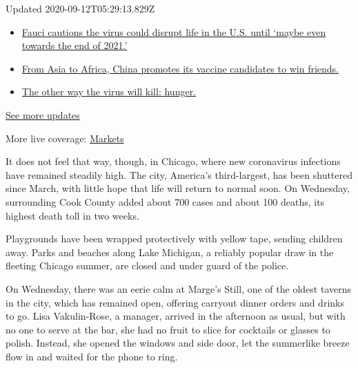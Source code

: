 Updated 2020-09-12T05:29:13.829Z

\begin{itemize}
\tightlist
\item
  \href{https://www.nytimes3xbfgragh.onion/2020/09/11/world/covid-19-coronavirus.html?action=click\&pgtype=Article\&state=default\&region=MAIN_CONTENT_1\&context=storylines_live_updates\#link-dfb8a16}{Fauci
  cautions the virus could disrupt life in the U.S. until `maybe even
  towards the end of 2021.'}
\item
  \href{https://www.nytimes3xbfgragh.onion/2020/09/11/world/covid-19-coronavirus.html?action=click\&pgtype=Article\&state=default\&region=MAIN_CONTENT_1\&context=storylines_live_updates\#link-7104d154}{From
  Asia to Africa, China promotes its vaccine candidates to win friends.}
\item
  \href{https://www.nytimes3xbfgragh.onion/2020/09/11/world/covid-19-coronavirus.html?action=click\&pgtype=Article\&state=default\&region=MAIN_CONTENT_1\&context=storylines_live_updates\#link-393ad215}{The
  other way the virus will kill: hunger.}
\end{itemize}

\href{https://www.nytimes3xbfgragh.onion/2020/09/11/world/covid-19-coronavirus.html?action=click\&pgtype=Article\&state=default\&region=MAIN_CONTENT_1\&context=storylines_live_updates}{See
more updates}

More live coverage:
\href{https://www.nytimes3xbfgragh.onion/live/2020/09/11/business/stock-market-today-coronavirus?action=click\&pgtype=Article\&state=default\&region=MAIN_CONTENT_1\&context=storylines_live_updates}{Markets}

It does not feel that way, though, in Chicago, where new coronavirus
infections have remained steadily high. The city, America's
third-largest, has been shuttered since March, with little hope that
life will return to normal soon. On Wednesday, surrounding Cook County
added about 700 cases and about 100 deaths, its highest death toll in
two weeks.

Playgrounds have been wrapped protectively with yellow tape, sending
children away. Parks and beaches along Lake Michigan, a reliably popular
draw in the fleeting Chicago summer, are closed and under guard of the
police.

On Wednesday, there was an eerie calm at Marge's Still, one of the
oldest taverns in the city, which has remained open, offering carryout
dinner orders and drinks to go. Lisa Vakulin-Rose, a manager, arrived in
the afternoon as usual, but with no one to serve at the bar, she had no
fruit to slice for cocktails or glasses to polish. Instead, she opened
the windows and side door, let the summerlike breeze flow in and waited
for the phone to ring.


